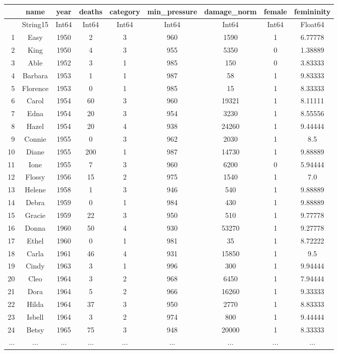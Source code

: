 \documentclass[
  letterpaper,
  DIV=11,
  numbers=noendperiod]{scrartcl}
\begin{document}
\begin{tabular}{r|cccccccc}
    & name & year & deaths & category & min\_pressure & damage\_norm & female & femininity\\
    \hline
    & String15 & Int64 & Int64 & Int64 & Int64 & Int64 & Int64 & Float64\\
    \hline
    1 & Easy & 1950 & 2 & 3 & 960 & 1590 & 1 & 6.77778 \\
    2 & King & 1950 & 4 & 3 & 955 & 5350 & 0 & 1.38889 \\
    3 & Able & 1952 & 3 & 1 & 985 & 150 & 0 & 3.83333 \\
    4 & Barbara & 1953 & 1 & 1 & 987 & 58 & 1 & 9.83333 \\
    5 & Florence & 1953 & 0 & 1 & 985 & 15 & 1 & 8.33333 \\
    6 & Carol & 1954 & 60 & 3 & 960 & 19321 & 1 & 8.11111 \\
    7 & Edna & 1954 & 20 & 3 & 954 & 3230 & 1 & 8.55556 \\
    8 & Hazel & 1954 & 20 & 4 & 938 & 24260 & 1 & 9.44444 \\
    9 & Connie & 1955 & 0 & 3 & 962 & 2030 & 1 & 8.5 \\
    10 & Diane & 1955 & 200 & 1 & 987 & 14730 & 1 & 9.88889 \\
    11 & Ione & 1955 & 7 & 3 & 960 & 6200 & 0 & 5.94444 \\
    12 & Flossy & 1956 & 15 & 2 & 975 & 1540 & 1 & 7.0 \\
    13 & Helene & 1958 & 1 & 3 & 946 & 540 & 1 & 9.88889 \\
    14 & Debra & 1959 & 0 & 1 & 984 & 430 & 1 & 9.88889 \\
    15 & Gracie & 1959 & 22 & 3 & 950 & 510 & 1 & 9.77778 \\
    16 & Donna & 1960 & 50 & 4 & 930 & 53270 & 1 & 9.27778 \\
    17 & Ethel & 1960 & 0 & 1 & 981 & 35 & 1 & 8.72222 \\
    18 & Carla & 1961 & 46 & 4 & 931 & 15850 & 1 & 9.5 \\
    19 & Cindy & 1963 & 3 & 1 & 996 & 300 & 1 & 9.94444 \\
    20 & Cleo & 1964 & 3 & 2 & 968 & 6450 & 1 & 7.94444 \\
    21 & Dora & 1964 & 5 & 2 & 966 & 16260 & 1 & 9.33333 \\
    22 & Hilda & 1964 & 37 & 3 & 950 & 2770 & 1 & 8.83333 \\
    23 & Isbell & 1964 & 3 & 2 & 974 & 800 & 1 & 9.44444 \\
    24 & Betsy & 1965 & 75 & 3 & 948 & 20000 & 1 & 8.33333 \\
    $\dots$ & $\dots$ & $\dots$ & $\dots$ & $\dots$ & $\dots$ & $\dots$ & $\dots$ & $\dots$ \\
\end{tabular}
\end{document}
